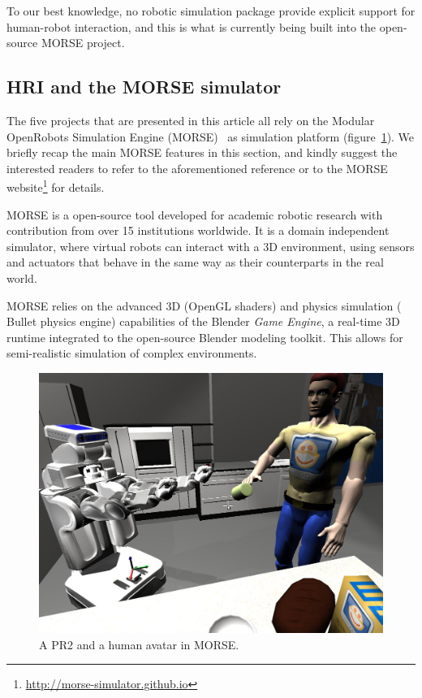 \documentclass[conference]{IEEEtran}
\begin{document}



To our best knowledge, no robotic simulation package provide explicit support
for human-robot interaction, and this is what is currently being built into the
open-source MORSE project.

\subsection*{HRI and the MORSE simulator}

The five projects that are presented in this article all rely on the Modular
OpenRobots Simulation Engine (MORSE)~\cite{Echeverria2011, morse_simpar_2012} as
simulation platform (figure~\ref{fig|morse-hri}). We briefly recap the main
MORSE features in this section, and kindly suggest the interested readers to
refer to the aforementioned reference or to the MORSE
website\footnote{\url{http://morse-simulator.github.io}} for details.

MORSE is a open-source tool developed for academic robotic research with
contribution from over 15 institutions worldwide. It is a domain independent
simulator, where virtual robots can interact with a 3D environment, using
sensors and actuators that behave in the same way as their counterparts in the
real world.

MORSE relies on the advanced 3D (OpenGL shaders) and physics simulation ({\sc
Bullet} physics engine) capabilities of the Blender \emph{Game Engine}, a
real-time 3D runtime integrated to the open-source Blender modeling toolkit.
This allows for semi-realistic simulation of complex environments.

\begin{figure}[t]
      \centering
      \includegraphics[width=0.9\linewidth]{morse_pr2.jpg}
      \caption{A PR2 and a human avatar in MORSE.}
      \label{fig|morse-hri}
\end{figure}
\end{document}
